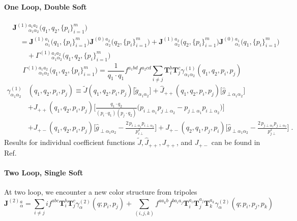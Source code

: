 \documentclass[a4paper,11pt]{article}
\begin{document}
\paragraph{One Loop, Double Soft}
\begin{align}
&\mathbf{J}^{(1)}{}^{a_1 a_2}_{\alpha_1 \alpha_2}\big( q_1, q_2,\{ p_i \}_{i=1}^m \big) \\
& \quad = \mathbf{J}^{(1)}{}^{a_1}_{ \alpha_1}\big( q_1,\{ p_i \}_{i=1}^m \big) \mathbf{J}^{(0)}{}^{a_2}_{ \alpha_2}\big( q_2,\{ p_i \}_{i=1}^m \big) + \mathbf{J}^{(1)}{}^{a_2}_{\alpha_2}\big( q_2,\{ p_i \}_{i=1}^m \big) \mathbf{J}^{(0)}{}^{a_1}_{\alpha_1}\big( q_1,\{ p_i \}_{i=1}^m \big)  \\
& \qquad + \Gamma^{(1)}{}^{a_1 a_2}_{\alpha_1 \alpha_2}\big( q_1, q_2,\{ p_i \}_{i=1}^m \big)
\end{align}
%
\begin{equation}
\Gamma^{(1)}{}^{a_1 a_2}_{\alpha_1 \alpha_2}\big( q_1, q_2,\{ p_i \}_{i=1}^m \big) = \frac{1}{q_1 \cdot q_1} f^{a_1 b d} f^{a_2 c d} \sum_{i \neq j} \mathbf{T}_i^b \mathbf{T}_j^c \gamma^{(1)}_{\alpha_1 \alpha_2} (q_1, q_2, p_i, p_j)
\end{equation}
%
\begin{equation}
\begin{split}
\gamma^{(1)}_{\alpha_1 \alpha_2}& (q_1, q_2, p_i, p_j) \equiv \tilde{J}(q_1, q_2, p_i, p_j) \big[ \tilde{g}_{\alpha_1 \alpha_2} \big] + \hat{J}_{++} (q_1, q_2, p_i, p_j) \big[ \hat{g}_{\perp\alpha_1 \alpha_2} \big] \\[.2cm]
 &+J_{++}(q_1, q_2, p_i, p_j) \bigg[  \frac{q_1 \cdot q_2}{(p_i \cdot q_1) (p_j \cdot q_2)} \big( p_{i\perp\alpha_1} p_{j\perp\alpha_2} - p_{j\perp\alpha_1} p_{i\perp\alpha_2} \big) \bigg] \\[.2cm]
 &+J_{+-}(q_1, q_2, p_i, p_j) \bigg[ \hat{g}_{\perp \alpha_1 \alpha_2} - \frac{2 \, p_{i\perp\alpha_1} p_{i\perp\alpha_2}}{p_{i\perp}^2} \bigg] + J_{+-}(q_2, q_1, p_j, p_i) \bigg[ \hat{g}_{\perp \alpha_1 \alpha_2} - \frac{2 \, p_{j\perp\alpha_1} p_{j\perp\alpha_2}}{p_{j\perp}^2} \bigg] \; .
\end{split}
\end{equation}
%
Results for individual coefficient functions $\tilde{J}, \hat{J}_{++}, J_{++}$, and $J_{+-}$ can be found in Ref.~\cite{Czakon:2022dwk}
% 

\paragraph{Two Loop, Single Soft}
At two loop, we encounter a new color structure from tripoles 
\begin{equation}
\mathbf{J}^{(2)}{}^a_\alpha = \sum_{i \neq j} i f^{abc} \mathbf{T}_i^b \mathbf{T}_j^c \gamma_\alpha^{(2)}(q; p_i, p_j) + \sum_{(i,j,k)} f^{a a_k b} f^{b a_i a_j} \mathbf{T}_i^{a_i} \mathbf{T}_j^{a_j} \mathbf{T}_k^{a_k} \gamma^{(2)}_\alpha (q; p_i, p_j, p_k)
\end{equation}
\end{document}
